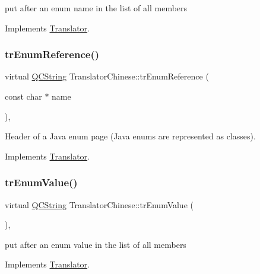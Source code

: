 put after an enum name in the list of all members 

Implements \mbox{\hyperlink{class_translator}{Translator}}.

\mbox{\label{class_translator_chinese_ac41690f621caef07e515d2cd8e58392e}} 
\subsubsection{\texorpdfstring{trEnumReference()}{trEnumReference()}}
{\footnotesize\ttfamily virtual \mbox{\hyperlink{class_q_c_string}{Q\+C\+String}} Translator\+Chinese\+::tr\+Enum\+Reference (\begin{DoxyParamCaption}\item[{const char $\ast$}]{name }\end{DoxyParamCaption})\hspace{0.3cm}{\ttfamily [inline]}, {\ttfamily [virtual]}}

Header of a Java enum page (Java enums are represented as classes). 

Implements \mbox{\hyperlink{class_translator}{Translator}}.

\mbox{\label{class_translator_chinese_a53639b2b66e0959a98363bec0c264bb0}} 
\subsubsection{\texorpdfstring{trEnumValue()}{trEnumValue()}}
{\footnotesize\ttfamily virtual \mbox{\hyperlink{class_q_c_string}{Q\+C\+String}} Translator\+Chinese\+::tr\+Enum\+Value (\begin{DoxyParamCaption}{ }\end{DoxyParamCaption})\hspace{0.3cm}{\ttfamily [inline]}, {\ttfamily [virtual]}}

put after an enum value in the list of all members 

Implements \mbox{\hyperlink{class_translator}{Translator}}.

\mbox{\label{class_translator_chinese_ad0bb3e2015b491a3a396e7a526588ae2}} 
